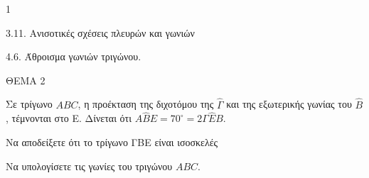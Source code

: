 \begin{ylh}{1}
    \item 3.11. Ανισοτικές σχέσεις πλευρών και γωνιών
    \item 4.6. Άθροισμα γωνιών τριγώνου.
\end{ylh}

ΘΕΜΑ 2

Σε τρίγωνο $ABC$, η προέκταση της διχοτόμου της $\widehat{\Gamma}$ και της εξωτερικής γωνίας του $\widehat{B}$, τέμνονται στο Ε. Δίνεται ότι $A\widehat{B}E = 70^{\circ} = 2\Gamma\widehat{E}B$.


\begin{alist}
\item Να αποδείξετε ότι το τρίγωνο ΓΒΕ είναι ισοσκελές 

\item Να υπολογίσετε τις γωνίες του τριγώνου $ABC$. 


\begin{center}
\end{center}
\end{alist}
